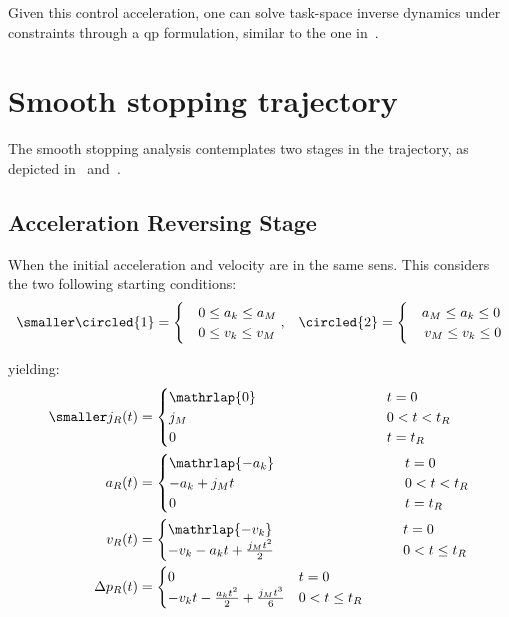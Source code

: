 Given this control acceleration, one can solve task-space inverse dynamics under
constraints through a \gls{qp} formulation, similar to the one
in~\cite{joseph2018towards}.

\chapter{Smooth stopping trajectory}
\label{sec:stopping_strategy}

The smooth stopping analysis contemplates two stages in the trajectory, as
depicted in~ and~.


\section{Acceleration Reversing Stage}

When the initial acceleration and velocity are in the same sens.
This considers the two following starting conditions:
{
\begin{align}
  \smaller
  \circled{1} &=
\begin{cases}
      & 0 \leq a_k \leq a_M \\
      & 0 \leq v_k \leq v_M
\end{cases},
& \circled{2} =
\begin{cases}
      & a_M \leq a_k \leq 0 \\
      & \, v_M \leq v_k \leq 0
\end{cases}
\end{align}
}

yielding:
{
\smaller
\newcommand\longest[0]{
-v_k t - \frac{a_k t^2}{2} + \frac{j_Mt^3}{6}
}
\begin{align}
  \smaller
  j_R (t) &=
\begin{cases}
      \mathrlap{0} \hphantom{\longest} & t=0 \\
      j_M & 0 < t < t_R \\
      0 & t = t_R
\end{cases} \\
a_R (t) &=
\begin{cases}
    \mathrlap{-a_k} \hphantom{\longest} & t=0 \\
    -a_k + j_M t & 0 < t < t_R \\
    0 & t = t_R
\end{cases}\\
v_R (t) &=
\begin{cases}
      \mathrlap{-v_k} \hphantom{\longest} & t=0 \\
      -v_k - a_k t + \frac{j_Mt^2}{2} &  0< t\leq t_R
\end{cases}\\
\Delta p_R (t) &=
\begin{cases}
    0 & t=0 \\
    \longest & 0< t\leq t_R
\end{cases}
\end{align}
}

